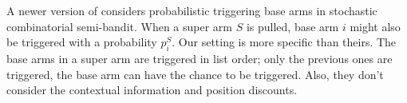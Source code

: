 \documentclass{article}
\newcommand{\RR}{\mathbb{R}}
\newcommand{\bA}{\mathbf{A}}
\newcommand{\ba}{\mathbf{a}}
\newcommand{\bw}{\mathbf{w}}
\newcommand{\cS}{\mathcal{S}}
\newcommand{\abs}[1]{\left| #1 \right|}
\newcommand{\norm}[1]{\| #1 \|}
\newcommand{\shengyu}[1]{{\color{green!50!black} [\text{Shengyu:} #1]}}
\begin{document}
A newer version of \cite{chen2013combinatorial} considers probabilistic triggering base arms in stochastic combinatorial semi-bandit. When a super arm $S$ is pulled, base arm $i$ might also be triggered with a probability $p_i^{S}$. Our setting is more specific than theirs. The base arms in a super arm are triggered in list order; only the previous ones are triggered, the base arm can have the chance to be triggered.
Also, they don't consider the contextual information and position discounts.




\end{document}
